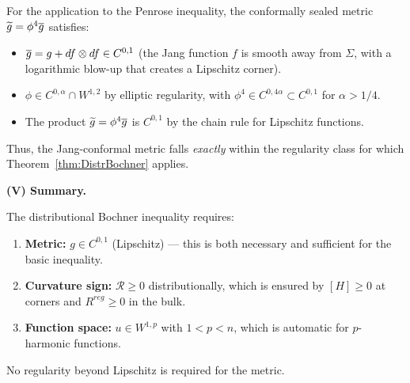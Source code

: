 \begin{remark}
For the application to the Penrose inequality, the conformally sealed metric $\widetilde{g} = \phi^4 \overline{g}$ satisfies:
\begin{itemize}
    \item $\overline{g} = g + df \otimes df \in C^{0,1}$ (the Jang function $f$ is smooth away from $\Sigma$, with a logarithmic blow-up that creates a Lipschitz corner).
    \item $\phi \in C^{0,\alpha} \cap W^{1,2}$ by elliptic regularity, with $\phi^4 \in C^{0,4\alpha} \subset C^{0,1}$ for $\alpha > 1/4$.
    \item The product $\widetilde{g} = \phi^4 \overline{g}$ is $C^{0,1}$ by the chain rule for Lipschitz functions.
\end{itemize}
Thus, the Jang-conformal metric falls \emph{exactly} within the regularity class for which Theorem~\ref{thm:DistrBochner} applies.

\textbf{(V) Summary.}

The distributional Bochner inequality requires:
\begin{enumerate}
    \item \textbf{Metric:} $g \in C^{0,1}$ (Lipschitz) --- this is both necessary and sufficient for the basic inequality.
    \item \textbf{Curvature sign:} $\mathcal{R} \ge 0$ distributionally, which is ensured by $[H] \ge 0$ at corners and $R^{reg} \ge 0$ in the bulk.
    \item \textbf{Function space:} $u \in W^{1,p}$ with $1 < p < n$, which is automatic for $p$-harmonic functions.
\end{enumerate}
No regularity beyond Lipschitz is required for the metric.
\end{remark}

